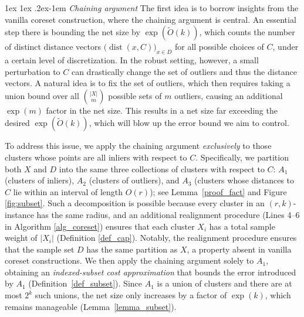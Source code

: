 \documentclass[11pt,letterpaper]{article}
\makeatletter
\renewcommand{\subparagraph}{%
	\@startsection{subparagraph}{5}%
	{\parindent}{1ex \@plus 1ex \@minus .2ex}{-1em}%
	{\normalfont\normalsize\bfseries}%
}
\theoremstyle{definition}
\DeclareMathOperator{\dist}{dist}
\makeatother
\begin{document}
\subparagraph{\em Chaining argument}
The first idea is to borrow insights from the vanilla coreset construction, where the chaining argument is central.
%
An essential step there is bounding the net size by \(\exp(\tilde{O}(k))\), which counts the number of distinct distance vectors \(\bigl(\dist(x,C)\bigr)_{x \in D}\) for all possible choices of \(C\), under a certain level of discretization. 
%
In the robust setting, however, a small perturbation to $C$ can drastically change the set of outliers and thus the distance vectors. 
%
A natural idea is to fix the set of outliers, which then requires taking a union bound over all $\binom{|X|}{m}$ possible sets of $m$ outliers, causing an additional $\exp(m)$ factor in the net size.
%
This results in a net size far exceeding the desired \(\exp(\tilde{O}(k))\), which will blow up the error bound we aim to control. 

To address this issue, we apply the chaining argument \emph{exclusively} to those clusters whose points are all inliers with respect to \(C\). 
%
Specifically, we partition both \(X\) and \(D\) into the same three collections of clusters with respect to \(C\): \(A_1\) (clusters of inliers), \(A_2\) (clusters of outliers), and \(A_3\) (clusters whose distances to \(C\) lie within an interval of length \(O(r)\)); see Lemma~\ref{proof_fact} and Figure \ref{fig:subset}.
%
Such a decomposition is possible because every cluster in an \((r,k)\)-instance has the same radius, and an additional realignment procedure (Lines 4–6 in Algorithm \ref{alg_coreset}) ensures that each cluster \(X_i\) has a total sample weight of  \(|X_i|\) (Definition \ref{def_cap}).
%
Notably, the realignment procedure ensures that the sample set \(D\) has the same partition as \(X\), a property absent in vanilla coreset constructions.
%
We then apply the chaining argument solely to \(A_1\), obtaining an \emph{indexed-subset cost approximation} that bounds the error introduced by \(A_1\) (Definition~\ref{def_subset}). 
%
Since \(A_1\) is a union of clusters and there are at most \(2^k\) such unions, the net size only increases by a factor of \(\exp(k)\), which remains manageable (Lemma~\ref{lemma_subset}).
%
\end{document}
